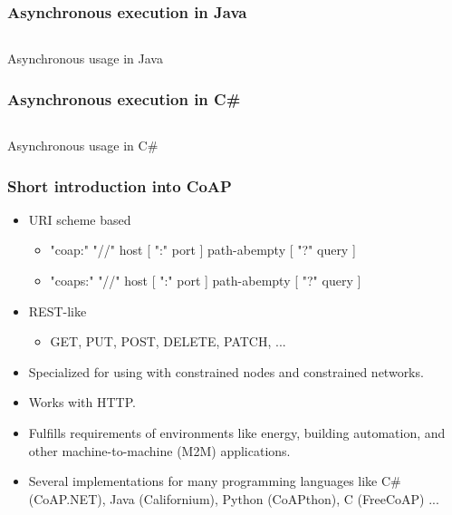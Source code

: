 \documentclass[11pt,t,usepdftitle=false,aspectratio=169,usenames,dvipsnames]{beamer}
\begin{document}
    \begin{frame}
        \frametitle{Asynchronous execution in Java}
        
        \begin{listing}[H]
            \inputminted[framesep=2mm, baselinestretch=1.2, fontsize=\scriptsize, linenos]{java}{codes/example_asynchronous.java}
            \caption{Asynchronous usage in Java}
            \label{listing:asynchronous-usage-in-java}
        \end{listing}
    \end{frame}

    \begin{frame}
        \frametitle{Asynchronous execution in C\#}

        \begin{listing}[H]
            \inputminted[framesep=2mm, baselinestretch=1.2, fontsize=\scriptsize, linenos]{java}{codes/example_asynchronous.cs}
            \caption{Asynchronous usage in C\#}
            \label{listing:asynchronous-usage-in-csharp}
        \end{listing}
    \end{frame}

    \begin{frame}
        \frametitle{Short introduction into CoAP}

        \begin{itemize}
            \item URI scheme based
            \begin{itemize}
                \item "coap:" "//" host [ ":" port ] path-abempty [ "?" query ]
                \item "coaps:" "//" host [ ":" port ] path-abempty [ "?" query ]
            \end{itemize}
            \item REST-like
            \begin{itemize}
                \item GET, PUT, POST, DELETE, PATCH, ...
            \end{itemize}
            \item Specialized for using with constrained nodes and constrained networks.
            \item Works with HTTP.
            \item Fulfills requirements of environments like energy, building automation, and other machine-to-machine (M2M) applications.
            \item Several implementations for many programming languages like C\# (CoAP.NET), Java (Californium), Python (CoAPthon), C (FreeCoAP) ...
        \end{itemize}
    \end{frame}
\end{document}
